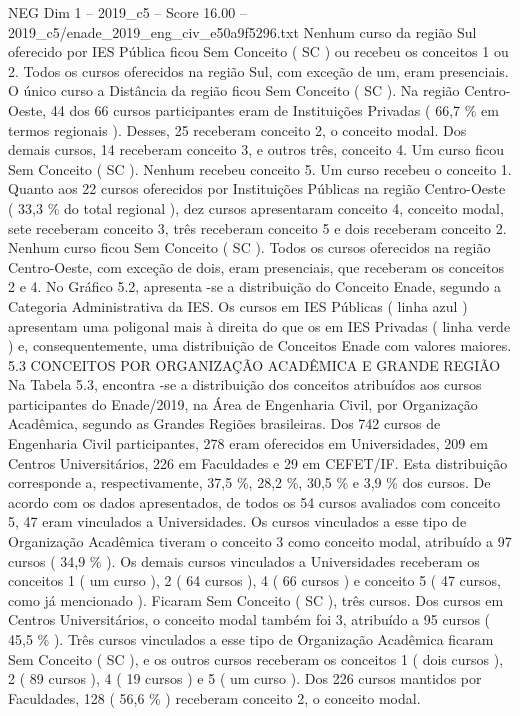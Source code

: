 \begin{textsample}{NEG Dim 1 – 2019\_c5 – Score 16.00 – 2019\_c5/enade\_2019\_eng\_civ\_e50a9f5296.txt}
Nenhum curso da região Sul oferecido por IES Pública ficou Sem Conceito ( SC ) ou recebeu os conceitos 1 ou 2.
Todos os cursos oferecidos na região Sul, com exceção de um, eram presenciais.
O único curso a Distância da região ficou Sem Conceito ( SC ).
Na região Centro-Oeste, 44 dos 66 cursos participantes eram de Instituições Privadas ( 66,7 \% em termos regionais ).
Desses, 25 receberam conceito 2, o conceito modal.
Dos demais cursos, 14 receberam conceito 3, e outros três, conceito 4.
Um curso ficou Sem Conceito ( SC ).
Nenhum recebeu conceito 5.
Um curso recebeu o conceito 1.
Quanto aos 22 cursos oferecidos por Instituições Públicas na região Centro-Oeste ( 33,3 \% do total regional ), dez cursos apresentaram conceito 4, conceito modal, sete receberam conceito 3, três receberam conceito 5 e dois receberam conceito 2.
Nenhum curso ficou Sem Conceito ( SC ).
Todos os cursos oferecidos na região Centro-Oeste, com exceção de dois, eram presenciais, que receberam os conceitos 2 e 4.
No Gráfico 5.2, apresenta -se a distribuição do Conceito Enade, segundo a Categoria Administrativa da IES.
Os cursos em IES Públicas ( linha azul ) apresentam uma poligonal mais à direita do que os em IES Privadas ( linha verde ) e, consequentemente, uma distribuição de Conceitos Enade com valores maiores. 5.3 CONCEITOS POR ORGANIZAÇÃO ACADÊMICA E GRANDE REGIÃO Na Tabela 5.3, encontra -se a distribuição dos conceitos atribuídos aos cursos participantes do Enade/2019, na Área de Engenharia Civil, por Organização Acadêmica, segundo as Grandes Regiões brasileiras.
Dos 742 cursos de Engenharia Civil participantes, 278 eram oferecidos em Universidades, 209 em Centros Universitários, 226 em Faculdades e 29 em CEFET/IF.
Esta distribuição corresponde a, respectivamente, 37,5 \%, 28,2 \%, 30,5 \% e 3,9 \% dos cursos.
De acordo com os dados apresentados, de todos os 54 cursos avaliados com conceito 5, 47 eram vinculados a Universidades.
Os cursos vinculados a esse tipo de Organização Acadêmica tiveram o conceito 3 como conceito modal, atribuído a 97 cursos ( 34,9 \% ).
Os demais cursos vinculados a Universidades receberam os conceitos 1 ( um curso ), 2 ( 64 cursos ), 4 ( 66 cursos ) e conceito 5 ( 47 cursos, como já mencionado ).
Ficaram Sem Conceito ( SC ), três cursos.
Dos cursos em Centros Universitários, o conceito modal também foi 3, atribuído a 95 cursos ( 45,5 \% ).
Três cursos vinculados a esse tipo de Organização Acadêmica ficaram Sem Conceito ( SC ), e os outros cursos receberam os conceitos 1 ( dois cursos ), 2 ( 89 cursos ), 4 ( 19 cursos ) e 5 ( um curso ).
Dos 226 cursos mantidos por Faculdades, 128 ( 56,6 \% ) receberam conceito 2, o conceito modal.

\end{textsample}
